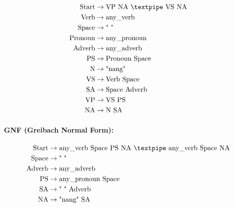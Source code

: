 \begin{equation*}
    \begin{aligned}
        \text{Start}   & \rightarrow \text{VP NA {\textpipe} VS NA} \\
        \text{Verb}    & \rightarrow \text{any\_verb}               \\
        \text{Space}   & \rightarrow \text{" "}                     \\
        \text{Pronoun} & \rightarrow \text{any\_pronoun}            \\
        \text{Adverb}  & \rightarrow \text{any\_adverb}             \\
        \text{PS}      & \rightarrow \text{Pronoun Space}           \\
        \text{N}       & \rightarrow \text{"nang"}                  \\
        \text{VS}      & \rightarrow \text{Verb Space}              \\
        \text{SA}      & \rightarrow \text{Space Adverb}            \\
        \text{VP}      & \rightarrow \text{VS PS}                   \\
        \text{NA}      & \rightarrow \text{N SA}
    \end{aligned}
\end{equation*}

\paragraph{GNF (Greibach Normal Form):}

\begin{equation*}
    \begin{aligned}
        \text{Start}  & \rightarrow \text{any\_verb Space PS NA {\textpipe} any\_verb Space NA} \\
        \text{Space}  & \rightarrow \text{" "}                                                  \\
        \text{Adverb} & \rightarrow \text{any\_adverb}                                          \\
        \text{PS}     & \rightarrow \text{any\_pronoun Space}                                   \\
        \text{SA}     & \rightarrow \text{" " Adverb}                                           \\
        \text{NA}     & \rightarrow \text{"nang" SA}
    \end{aligned}
\end{equation*}


